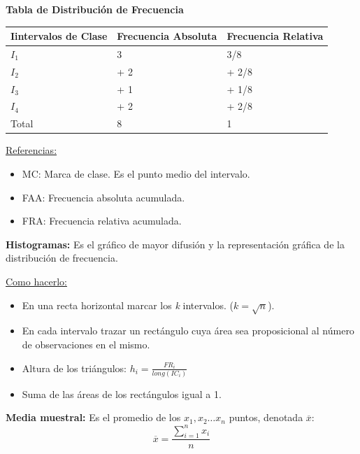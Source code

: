 \documentclass[12pt,a4paper]{report}
\begin{document}
	\vspace{3mm}
	\par \textbf{Tabla de Distribución de Frecuencia}
	\begin{table}[htbp]
		\begin{center}
			\begin{tabular}{|l|l|l|}
				\hline
				Iintervalos de Clase & Frecuencia Absoluta & Frecuencia Relativa \\ \hline
				$I_{1}$ & 3 & 3/8 \\ \hline
				$I_{2}$ & + 2 & + 2/8 \\ \hline
				$I_{3}$ & + 1 & + 1/8 \\ \hline
				$I_{4}$ & + 2 & + 2/8 \\ \hline
				Total & 8 & 1 \\
				\hline
			\end{tabular}
		\end{center}
	\end{table}

	\underline{Referencias:}
	\begin{itemize}
		\item MC: Marca de clase. Es el punto medio del intervalo.
		\item FAA: Frecuencia absoluta acumulada.
		\item FRA: Frecuencia relativa acumulada.
	\end{itemize}
	
	\vspace{3mm}
	\par \textbf{Histogramas:} Es el gráfico de mayor difusión y la representación gráfica de la distribución de frecuencia.
	
	\par \underline{Como hacerlo:}
	\begin{itemize}
		\item En una recta horizontal marcar los \textit{k} intervalos. ($k = \sqrt{n}$).
		\item En cada intervalo trazar un rectángulo cuya área sea proposicional al número de observaciones en el mismo.
		\item Altura de los triángulos: $h_{i} = \frac{FR_{i}}{long(IC_{i})}$
		\item Suma de las áreas de los rectángulos igual a 1.
	\end{itemize}
	
	\vspace{3mm}
	\par \textbf{Media muestral:} Es el promedio de los $x_{1}, x_{2} \dotsc x_{n}$ puntos, denotada $\overline{x}$:
	\[
		\overline{x} = \frac{\sum_{i=1}^{n} x_{i}}{n}
	\]
	
\end{document}
